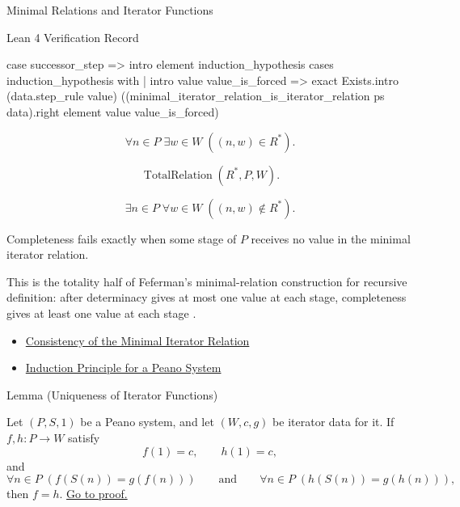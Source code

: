 \begin{topicbox}{Minimal Relations and Iterator Functions}
\begin{formalizationrecord}{Lean 4 Verification Record}
\begin{leancode}
  case successor_step =>
    intro element induction_hypothesis
    cases induction_hypothesis with
    | intro value value_is_forced =>
        exact
          Exists.intro
            (data.step_rule value)
            ((minimal_iterator_relation_is_iterator_relation ps data).right
              element value value_is_forced)
\end{leancode}
\end{formalizationrecord}

\begin{remark*}
\[
\forall n\in P\;\exists w\in W\;((n,w)\in R^*).
\]
\end{remark*}

\begin{remark*}
\[
\operatorname{TotalRelation}(R^*,P,W).
\]
\end{remark*}

\begin{remark*}
\[
\exists n\in P\;\forall w\in W\;((n,w)\notin R^*).
\]
\end{remark*}

\begin{remark*}
Completeness fails exactly when some stage of $P$ receives no value in the
minimal iterator relation.
\end{remark*}

\begin{remark*}
This is the totality half of Feferman's minimal-relation construction for
recursive definition: after determinacy gives at most one value at each stage,
completeness gives at least one value at each stage
\citep{FefermanNumberSystems1964}.
\end{remark*}

\begin{dependencies}
\begin{itemize}
  \item \hyperref[lem:iterator-relation-consistency]{Consistency of the Minimal Iterator Relation}
  \item \hyperref[thm:induction-principle-for-peano-system]{Induction Principle for a Peano System}
\end{itemize}
\end{dependencies}

\begin{lemmabox}{Lemma (Uniqueness of Iterator Functions)}
\begin{lemma}
\label{lem:uniqueness-of-iterator-functions}
Let $(P,S,1)$ be a Peano system, and let $(W,c,g)$ be iterator data for it. If
$f,h:P\to W$ satisfy
\[
f(1)=c,\qquad h(1)=c,
\]
and
\[
\forall n\in P\;(f(S(n))=g(f(n)))
\qquad\text{and}\qquad
\forall n\in P\;(h(S(n))=g(h(n))),
\]
then $f=h$.
\hyperref[prf:uniqueness-of-iterator-functions]{Go to proof.}
\end{lemma}
\end{lemmabox}


\end{topicbox}
